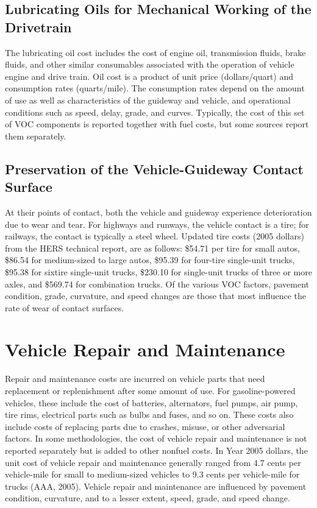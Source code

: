 \subsection{Lubricating Oils for Mechanical Working of the Drivetrain}
The lubricating oil cost includes the cost of engine oil, transmission fluids, brake fluids, and other similar consumables associated with the operation of vehicle engine and drive train. Oil cost is a product of unit price (dollars/quart) and consumption rates (quarts/mile). The consumption rates depend on the amount of use as well as characteristics of the guideway and vehicle, and operational conditions such as speed, delay, grade, and curves. Typically, the cost of this set of VOC components is reported together with fuel costs, but some sources report them separately.
\subsection{Preservation of the Vehicle-Guideway Contact Surface}
At their points of contact, both the vehicle and guideway experience deterioration due to wear and tear. For highways and runways, the vehicle contact is a tire; for railways, the contact is typically a steel wheel. Updated tire costs (2005 dollars) from the HERS technical report, are as follows: \$54.71 per tire for small autos, \$86.54 for medium-sized to large autos, \$95.39 for four-tire single-unit trucks, \$95.38 for sixtire single-unit trucks, \$230.10 for single-unit trucks of three or more axles, and \$569.74 for combination trucks. Of the various VOC factors, pavement condition, grade, curvature, and speed changes are those that most influence the rate of wear of contact surfaces.
\section{Vehicle Repair and Maintenance}
Repair and maintenance costs are incurred on vehicle parts that need replacement or replenishment after some amount of use. For gasoline-powered vehicles, these include the cost of batteries, alternators, fuel pumps, air pump, tire rims, electrical parts such as bulbs and fuses, and so on. These costs also include costs of replacing parts due to crashes, misuse, or other adversarial factors. In some methodologies, the cost of vehicle repair and maintenance is not reported separately but is added to other nonfuel costs. In Year 2005 dollars, the unit cost of vehicle repair and maintenance generally ranged from 4.7 cents per vehicle-mile for small to medium-sized vehicles to 9.3 cents per vehicle-mile for trucks (AAA, 2005). Vehicle repair and maintenance are influenced by pavement condition, curvature, and to a lesser extent, speed, grade, and speed change.
